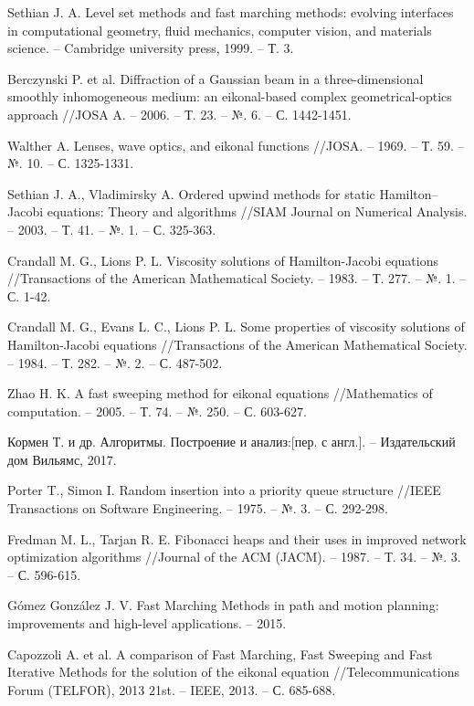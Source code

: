 \documentclass[a4paper,12pt]{article}
\begin{document}
\begin{thebibliography}{99}
 Sethian J. A. Level set methods and fast marching
  methods: evolving interfaces in computational geometry, fluid
  mechanics, computer vision, and materials science. – Cambridge
  university press, 1999. – Т. 3.

Berczynski P. et al. Diffraction of a Gaussian beam in
  a three-dimensional smoothly inhomogeneous medium: an eikonal-based
  complex geometrical-optics approach //JOSA A. – 2006. – Т. 23. –
  №. 6. – С. 1442-1451.

 Walther A. Lenses, wave optics, and eikonal functions
  //JOSA. – 1969. – Т. 59. – №. 10. – С. 1325-1331.
  
 Sethian J. A., Vladimirsky A. Ordered upwind methods
  for static Hamilton--Jacobi equations: Theory and algorithms //SIAM
  Journal on Numerical Analysis. – 2003. – Т. 41. – №. 1. –
  С. 325-363.
  
 Crandall M. G., Lions P. L. Viscosity solutions of
  Hamilton-Jacobi equations //Transactions of the American
  Mathematical Society. – 1983. – Т. 277. – №. 1. – С. 1-42.

 Crandall M. G., Evans L. C., Lions P. L. Some
  properties of viscosity solutions of Hamilton-Jacobi equations
  //Transactions of the American Mathematical Society. – 1984. –
  Т. 282. – №. 2. – С. 487-502.

  
 Zhao H. K. A fast sweeping method for eikonal
  equations //Mathematics of computation. – 2005. – Т. 74. – №. 250. –
  С. 603-627.

 Кормен Т. и др. Алгоритмы. Построение и анализ:[пер. с
  англ.]. – Издательский дом Вильямс, 2017.

 Porter T., Simon I. Random insertion into a priority
  queue structure //IEEE Transactions on Software Engineering. –
  1975. – №. 3. – С. 292-298.


 Fredman M. L., Tarjan R. E. Fibonacci heaps and their
  uses in improved network optimization algorithms //Journal of the
  ACM (JACM). – 1987. – Т. 34. – №. 3. – С. 596-615.

  
Gómez González J. V. Fast Marching Methods in path and
  motion planning: improvements and high-level applications. – 2015.
  
Capozzoli A. et al. A comparison of Fast Marching, Fast
  Sweeping and Fast Iterative Methods for the solution of the eikonal
  equation //Telecommunications Forum (TELFOR), 2013 21st. – IEEE,
  2013. – С. 685-688.
  

\end{thebibliography}
\end{document}
